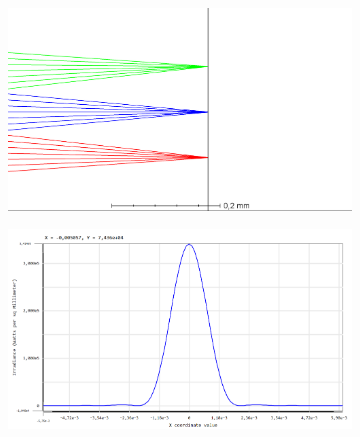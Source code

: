 \begin{figure}
     \centering
     \begin{subfigure}[b]{0.49\textwidth}
     \centering
     \includegraphics[width=\textwidth]{img/zemaxrange}
     \caption{}
     \label{zemaxrange}
     \end{subfigure}
     \hfill
     \begin{subfigure}[b]{0.49\textwidth}
      \centering
        \includegraphics[width=\textwidth]{img/zemaxfocus}
        \caption{}
        \label{zemaxfocus}
     \end{subfigure}
        \caption{}
\end{figure}

